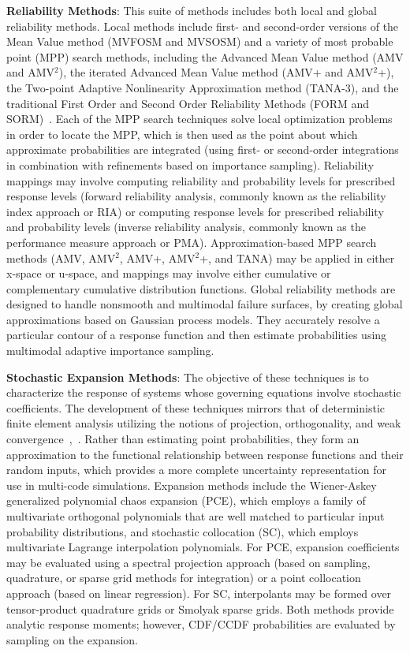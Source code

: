 \textbf{Reliability Methods}: This suite of methods includes both
local and global reliability methods.  Local methods include first-
and second-order versions of the Mean Value method (MVFOSM and MVSOSM)
and a variety of most probable point (MPP) search methods, including
the Advanced Mean Value method (AMV and AMV$^2$), the iterated
Advanced Mean Value method (AMV+ and AMV$^2$+), the Two-point Adaptive
Nonlinearity Approximation method (TANA-3), and the traditional First
Order and Second Order Reliability Methods (FORM and
SORM)~\cite{Hal00}.  Each of the MPP search techniques solve local
optimization problems in order to locate the MPP, which is then used
as the point about which approximate probabilities are integrated
(using first- or second-order integrations in combination with
refinements based on importance sampling). Reliability mappings may
involve computing reliability and probability levels for prescribed
response levels (forward reliability analysis, commonly known as the
reliability index approach or RIA) or computing response levels for
prescribed reliability and probability levels (inverse reliability
analysis, commonly known as the performance measure approach or PMA).
Approximation-based MPP search methods (AMV, AMV$^2$, AMV+, AMV$^2$+,
and TANA) may be applied in either x-space or u-space, and mappings
may involve either cumulative or complementary cumulative distribution
functions.  Global reliability methods are designed to handle
nonsmooth and multimodal failure surfaces, by creating global
approximations based on Gaussian process models.  They accurately
resolve a particular contour of a response function and then estimate
probabilities using multimodal adaptive importance sampling.

\textbf{Stochastic Expansion Methods}: The objective of these
techniques is to characterize the response of systems whose governing
equations involve stochastic coefficients. The development of these
techniques mirrors that of deterministic finite element analysis
utilizing the notions of projection, orthogonality, and weak
convergence~\cite{Gha99},~\cite{Gha91}.  Rather than estimating point
probabilities, they form an approximation to the functional
relationship between response functions and their random inputs, which
provides a more complete uncertainty representation for use in
multi-code simulations.  Expansion methods include the Wiener-Askey
generalized polynomial chaos expansion (PCE), which employs a family
of multivariate orthogonal polynomials that are well matched to
particular input probability distributions, and stochastic collocation
(SC), which employs multivariate Lagrange interpolation polynomials.
For PCE, expansion coefficients may be evaluated using a spectral
projection approach (based on sampling, quadrature, or sparse grid
methods for integration) or a point collocation approach (based on
linear regression).  For SC, interpolants may be formed over
tensor-product quadrature grids or Smolyak sparse grids.  Both methods
provide analytic response moments; however, CDF/CCDF probabilities are
evaluated by sampling on the expansion.

